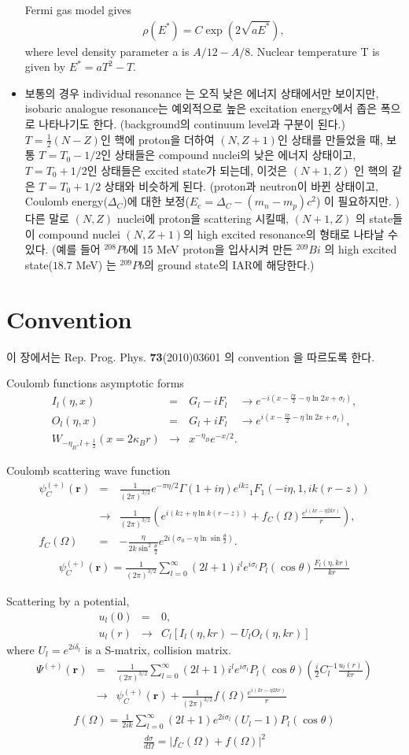 \documentclass[11pt]{book}
\def\bm{\boldsymbol}
\def\vr{{\bm r}}
\newcommand{\bea}{\begin{eqnarray}}
\newcommand{\eea}{\end{eqnarray}}
\newcommand{\no}{\nonumber \\}
\begin{document}
\begin{itemize}
	       Fermi gas model gives 
	       \bea 
	       \rho(E^*)= C \exp(2 \sqrt{a E^*}),
	       \eea 
	       where level density parameter a is $A/12-A/8$. 
	       Nuclear temperature T is given by $E^*=a T^2- T$. 
\item 보통의 경우 individual resonance 는 오직 낮은 에너지 상태에서만 보이지만, isobaric analogue resonance는
     예외적으로 높은 excitation energy에서 좁은 폭으로 나타나기도 한다. (background의  continuum level과 구분이 된다.)  $T=\frac{1}{2}(N-Z) $인 핵에 proton을 더하여 $(N,Z+1)$인 상태를 만들었을 때, 보통 $T=T_0-1/2$인 상태들은 compound nuclei의 낮은 에너지 상태이고, $T=T_0+1/2$인 상태들은 excited state가 되는데,
     이것은 $(N+1,Z)$ 인 핵의 같은 $T=T_0+1/2$ 상태와 비슷하게 된다. (proton과 neutron이 바뀐 상태이고,
     Coulomb energy($\Delta_C$)에 대한 보정($E_c=\Delta_C-(m_n-m_p)c^2$) 이 필요하지만. )
     다른 말로 $(N,Z)$ nuclei에 proton을 scattering 시킬때, $(N+1,Z)$ 의 state들이 
     compound nuclei $(N,Z+1)$의 high  excited resonance의 형태로 나타날 수 있다. 
     (예를 들어 $^{208}Pb$에 15 MeV proton을 입사시켜 만든 $^{209}Bi$ 의 high excited state($18.7$ MeV)
     는 $^{209}Pb$의 ground state의 IAR에 해당한다.) 
\end{itemize}

\section{Convention}
이 장에서는 Rep. Prog. Phys. {\bf 73}(2010)03601 의 convention 을 따르도록 한다.


Coulomb functions asymptotic forms 
\bea 
I_{l}(\eta,x)&=& G_l-iF_l \quad \to e^{-i(x-\frac{l\pi}{2}-\eta\ln 2x +\sigma_l)},\no 
O_{l}(\eta,x)&=& G_l+iF_l \quad \to e^{i(x-\frac{l\pi}{2}-\eta\ln 2x +\sigma_l)},\no 
W_{-\eta_B,l+\frac{1}{2}}(x=2\kappa_B r) &\to& x^{-\eta_B} e^{-x/2}. 
\eea 

Coulomb scattering wave function
\bea 
\psi^{(+)}_C(\vr)
&=&\frac{1}{(2\pi)^{3/2}}e^{-\pi\eta/2}\Gamma(1+i\eta) e^{ikz} {}_{1}F_1(-i\eta,1,ik(r-z)) \no 
&\to& \frac{1}{(2\pi)^{3/2}} \left( e^{i(kz+\eta\ln k(r-z))}
         +f_C(\Omega)\frac{e^{i(kr-\eta 2k r)}}{r}\right), \no 
f_C(\Omega)&=&-\frac{\eta}{2k\sin^2\frac{\theta}{2}} e^{2i(\sigma_0-\eta\ln\sin\frac{\theta}{2})}.         
\eea 
\bea 
\psi_C^{(+)}(\vr)=\frac{1}{(2\pi)^{3/2}}\sum_{l=0}^\infty (2l+1)i^l e^{i\sigma_l}P_l(\cos\theta)
\frac{F_l(\eta,kr)}{kr}
\eea 
         
Scattering by a potential,
\bea 
u_l(0)&=&0,\no 
u_l(r)&\to& C_l[I_l(\eta,kr)-U_l O_l(\eta,kr)]
\eea          
where $U_l=e^{2i\delta_l}$ is a S-matrix, collision matrix.        
\bea 
\Psi^{(+)}(\vr)&=&\frac{1}{(2\pi)^{3/2}}
                \sum_{l=0}^\infty (2l+1) i^l e^{i\sigma_l} P_l(\cos\theta)
                 \left(\frac{i}{2}C_l^{-1}\frac{u_l(r)}{kr}\right) \no 
              &\to& \psi_C^{(+)}(\vr)+
                    \frac{1}{(2\pi)^{3/2}} f(\Omega) \frac{e^{i(kr-\eta 2k r)}}{r}
\eea 
\bea 
f(\Omega)=\frac{1}{2ik}\sum_{l=0}^\infty (2l+1)e^{2i\sigma_l}(U_l-1)P_l(\cos\theta)
\eea 
\bea 
\frac{d\sigma}{d\Omega}=|f_C(\Omega)+f(\Omega)|^2
\eea 
\end{document}
